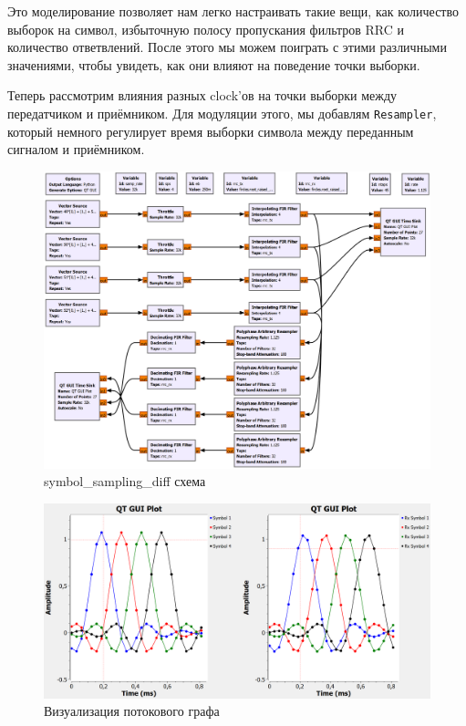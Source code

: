 \documentclass[a4paper,12pt]{report}
\begin{document}
Это моделирование позволяет нам легко настраивать такие вещи, как количество выборок на символ, избыточную полосу пропускания фильтров RRC и количество ответвлений. После этого мы можем поиграть с этими различными значениями, чтобы увидеть, как они влияют на поведение точки выборки.

Теперь рассмотрим влияния разных clock'ов на точки выборки между передатчиком и приёмником. Для модуляции этого, мы добавлям \texttt{Resampler}, который немного регулирует время выборки символа между переданным сигналом и приёмником.

\begin{figure}[H]
        \centering
        \includegraphics[width=1.0\textwidth]{lab12_fig3_3.png}
        \caption{symbol\_sampling\_diff схема}
        \label{fig:lab12_fig3_3}
\end{figure}

\begin{figure}[H]
        \centering
        \includegraphics[width=1.0\textwidth]{lab12_fig3_4.png}
        \caption{Визуализация потокового графа}
        \label{fig:lab12_fig3_4}
\end{figure}
\end{document}
